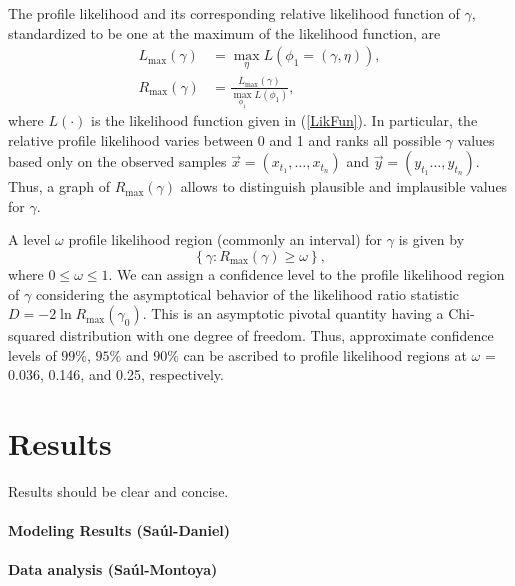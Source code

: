 \documentclass[draft, openbib]{imammb}
\numberwithin{equation}{section}
\begin{document}
        The profile likelihood and its corresponding relative likelihood
    function of $\gamma$, standardized to be one at the maximum of the
    likelihood function, are 
    \begin{equation}
        \begin{split}
            L_{\max}
                \left(
                \gamma\right)&=\max_{\eta}L\left(\phi_{1}=\left(\gamma,\eta \right)
            \right),  \nonumber \\
            R_{\max}
            \left(
                \gamma\right)   
                &=  
                    \frac{L_{\max}\left(\gamma\right)}{\displaystyle\max_{\phi_{1}}L\left(\phi_{1}\right)},
        \end{split}
\end{equation}
where $L\left(\cdot\right)$ is the likelihood function given in
(\ref{LikFun}). In particular, the relative profile likelihood varies between
0 and 1 and ranks all possible $\gamma$ values based only on the observed
samples $\vec{x}=\left(x_{t_1}, \dots , x_{t_n} \right)$ and
$\vec{y}=\left(y_{t_1} \dots , y_{t_n} \right)$. Thus, a graph of
$R_{\max}\left(\gamma\right)$ allows to distinguish plausible and implausible
values for $\gamma$.

A level $\omega$ profile likelihood region (commonly an interval) for $\gamma$ is given by
\begin{equation}
\left\{\gamma: R_{\max}\left(\gamma\right) \geq \omega \right\}, \nonumber
\end{equation}
where $0 \leq \omega \leq 1$. We can assign a confidence level to the
profile likelihood region of $\gamma$  considering the asymptotical
behavior of the likelihood ratio statistic
$D=-2\ln{R_{\max}\left(\gamma_{0}\right)}$. This is an asymptotic
pivotal quantity having a Chi-squared distribution with one degree of
freedom. Thus, approximate confidence levels of $99\%$, $95\%$ and
$90\%$ can be ascribed to profile likelihood regions at $\omega$ =
0.036, 0.146, and 0.25, respectively.
\section{Results}
        Results should be clear and concise.
        \paragraph{Modeling Results (Saúl-Daniel)}

\paragraph{Data analysis (Saúl-Montoya)}
\end{document}
